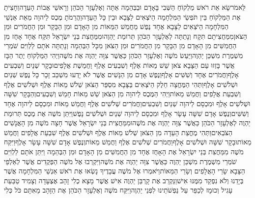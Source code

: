 \documentclass[../main/main.tex]{subfiles}
\begin{document}
\begin{multicols*}{\ncols}
לֵּאמֹר\PreVerseSpace{}שָׂא אֵת רֹאשׁ מַלְקוֹחַ הַשְּׁבִי בָּאָדָם וּבַבְּהֵמָה אַתָּה וְאֶלְעָזָר הַכֹּהֵן וְרָאשֵׁי אֲבוֹת הָעֵדָה\PreVerseSpace{}וְחָצִיתָ אֶת הַמַּלְקוֹחַ בֵּין תֹּפְשֵׂי הַמִּלְחָמָה הַיֹּצְאִים לַצָּבָא וּבֵין כָּל הָעֵדָה\PreVerseSpace{}וַהֲרֵמֹתָ מֶכֶס לַיהוָה מֵאֵת אַנְשֵׁי הַמִּלְחָמָה הַיֹּצְאִים לַצָּבָא אֶחָד נֶפֶשׁ מֵחֲמֵשׁ הַמֵּאוֹת מִן הָאָדָם וּמִן הַבָּקָר וּמִן הַחֲמֹרִים וּמִן הַצֹּאן\PreVerseSpace{}מִמַּחֲצִיתָם תִּקָח\SubEnd{} וְנָתַתָּה לְאֶלְעָזָר הַכֹּהֵן תְּרוּמַת יַהְוֶה\PreVerseSpace{}וּמִמַּחֲצִת בְּנֵי יִשְׂרָאֵל תִּקַּח אֶחָד אָחֻז מִן הַחֲמִשִּׁים מִן הָאָדָם מִן הַבָּקָר מִן הַחֲמֹרִים וּמִן הַצֹּאן מִכָּל הַבְּהֵמָה וְנָתַתָּה אֹתָם לַלְוִיִּם שֹׁמְרֵי מִשְׁמֶרֶת מִשְׁכַּן יַהְוֶה\PreVerseSpace{}וַיַּעַשׂ מֹשֶׁה וְאֶלְעָזָר הַכֹּהֵן כַּאֲשֶׁר צִוָּה יַהְוֶה אֶת מֹשֶׁה\PreVerseSpace{}וַיְהִי הַמַּלְקוֹחַ יֶתֶר הַבָּז אֲשֶׁר בָּזְזוּ עַם הַצָּבָא צֹאן שֵׁשׁ מֵאוֹת אֶלֶף וְשִׁבְעִים אֶלֶף וַחֲמֵשֶׁת אֲלָפִים\PreVerseSpace{}וּבָקָר שְׁנַיִם וְשִׁבְעִים אָלֶף\PreVerseSpace{}וַחֲמֹרִים אֶחָד וְשִׁשִּׁים אָלֶף\PreVerseSpace{}וְנֶפֶשׁ אָדָם מִן הַנָּשִׁים אֲשֶׁר לֹא יָדְעוּ מִשְׁכַּב זָכָר כָּל נֶפֶשׁ שְׁנַיִם וּשְׁלֹשִׁים אָלֶף\PreVerseSpace{}וַתְּהִי הַמֶּחֱצָה חֵלֶק הַיֹּצְאִים בַּצָּבָא מִסְפַּר הַצֹּאן שְׁלֹשׁ מֵאוֹת אֶלֶף וּשְׁלֹשִׁים אֶלֶף וְשִׁבְעַת אֲלָפִים וַחֲמֵשׁ מֵאוֹת\PreVerseSpace{}וַיְהִי הַמֶּכֶס לַיהוָה מִן הַצֹּאן שֵׁשׁ מֵאוֹת חָמֵשׁ וְשִׁבְעִים\PreVerseSpace{}וְהַבָּקָר שִׁשָּׁה וּשְׁלֹשִׁים אָלֶף וּמִכְסָם לַיהוָה שְׁנַיִם וְשִׁבְעִים\PreVerseSpace{}וַחֲמֹרִים שְׁלֹשִׁים אֶלֶף וַחֲמֵשׁ מֵאוֹת וּמִכְסָם לַיהוָה אֶחָד וְשִׁשִּׁים\PreVerseSpace{}וְנֶפֶשׁ אָדָם שִׁשָּׁה עָשָׂר אָלֶף וּמִכְסָם לַיהוָה שְׁנַיִם וּשְׁלֹשִׁים נָפֶשׁ\PreVerseSpace{}וַיִּתֵּן מֹשֶׁה אֶת מֶכֶס תְּרוּמַת יַהְוֶה לְאֶלְעָזָר הַכֹּהֵן כַּאֲשֶׁר צִוָּה יַהְוֶה אֶת מֹשֶׁה\PreVerseSpace{}וּמִמַּחֲצִית בְּנֵי יִשְׂרָאֵל אֲשֶׁר חָצָה מֹשֶׁה מִן הָאֲנָשִׁים הַצֹּבְאִים\PreVerseSpace{}וַתְּהִי מֶחֱצַת הָעֵדָה מִן הַצֹּאן שְׁלֹשׁ מֵאוֹת אֶלֶף וּשְׁלֹשִׁים אֶלֶף שִׁבְעַת אֲלָפִים וַחֲמֵשׁ מֵאוֹת\PreVerseSpace{}וּבָקָר שִׁשָּׁה וּשְׁלֹשִׁים אָלֶף\PreVerseSpace{}וַחֲמֹרִים שְׁלֹשִׁים אֶלֶף וַחֲמֵשׁ מֵאוֹת\PreVerseSpace{}וְנֶפֶשׁ אָדָם שִׁשָּׁה עָשָׂר אָלֶף\PreVerseSpace{}וַיִּקַּח מֹשֶׁה מִמַּחֲצִת בְּנֵי יִשְׂרָאֵל אֶת הָאָחֻז אֶחָד מִן הַחֲמִשִּׁים מִן הָאָדָם וּמִן הַבְּהֵמָה וַיִּתֵּן אֹתָם לַלְוִיִּם שֹׁמְרֵי מִשְׁמֶרֶת מִשְׁכַּן יַהְוֶה כַּאֲשֶׁר צִוָּה יַהְוֶה אֶת מֹשֶׁה\PreVerseSpace{}וַיִּקְרְבוּ אֶל מֹשֶׁה הַפְּקֻדִים אֲשֶׁר לְאַלְפֵי הַצָּבָא שָׂרֵי הָאֲלָפִים וְשָׂרֵי הַמֵּאוֹת\PreVerseSpace{}וַיֹּאמְרוּ אֶל מֹשֶׁה עֲבָדֶיךָ נָשְׂאוּ אֶת רֹאשׁ אַנְשֵׁי הַמִּלְחָמָה אֲשֶׁר בְּיָדֵנוּ וְלֹא נִפְקַד מִמֶּנּוּ אִישׁ\PreVerseSpace{}וַנַּקְרֵב אֶת קָרְבַּן יַהְוֶה אִישׁ אֲשֶׁר מָצָא כְלִי זָהָב אֶצְעָדָה וְצָמִיד טַבַּעַת עָגִיל וְכוּמָז לְכַפֵּר עַל נַפְשֹׁתֵינוּ לִפְנֵי יַהְוֶה\PreVerseSpace{}וַיִּקַּח מֹשֶׁה וְאֶלְעָזָר הַכֹּהֵן אֶת הַזָּהָב מֵאִתָּם כֹּל כְּלִי 
\end{multicols*}
\end{document}
